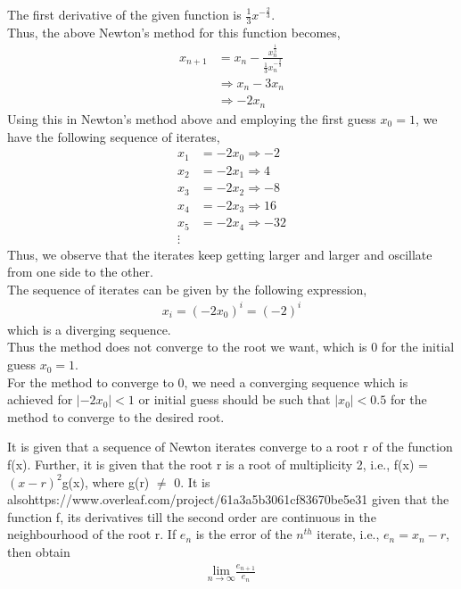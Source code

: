 \documentclass[letterpaper]{exam}
\begin{document}
\begin{questions}
\begin{solution}
The first derivative of the given function is $\frac{1}{3}x^{-\frac{2}{3}}$.\\
Thus, the above Newton's method for this function becomes,
\begin{align*}
    x_{n+1} &= x_n - \frac{x_n^{\frac{1}{3}}}{\frac{1}{3}x_n^{-\frac{2}{3}}}\\
    &\Rightarrow 
    x_n - 3x_n\\
    &\Rightarrow
    -2x_n
\end{align*}
Using this in Newton's method above and employing the first guess $x_0 = 1$, we have the following sequence of iterates,
\begin{align*}
    x_1 &= -2x_0 \Rightarrow -2\\
    x_2 &= -2x_1 \Rightarrow 4\\
    x_3 &= -2x_2 \Rightarrow -8\\
    x_4 &= -2x_3 \Rightarrow 16\\
    x_5 &= -2x_4 \Rightarrow -32\\
    \vdots
\end{align*}
Thus, we observe that the iterates keep getting larger and larger and oscillate from one side to the other.\\
The sequence of iterates can be given by the following expression,
\begin{align*}
    x_i = (-2x_0)^i = (-2)^i
\end{align*}
which is a diverging sequence.\\
Thus the method does not converge to the root we want, which is 0 for the initial guess $x_0 = 1$.\\
For the method to converge to 0, we need a converging sequence which is achieved for $\left|-2x_0\right| < 1$ or initial guess should be such that $\left|x_0\right| < 0.5$ for the method to converge to the desired root.
\end{solution}
\question [6]  It is given that a sequence of Newton iterates converge to a root r of the function f(x). Further, it is given that the root r is a root of multiplicity 2, i.e., f(x) = $(x − r)^2$g(x), where g(r) $\neq$ 0. It is alsohttps://www.overleaf.com/project/61a3a5b3061cf83670be5e31
given that the function f, its derivatives till the second order are continuous in the neighbourhood of the root r. If $e_n$ is the error of the $n^{th}$ iterate, i.e., $e_n = x_n − r$, then obtain
\begin{align*}
    \underset{n \rightarrow \infty }{\text{lim} } \frac{e_{n+1}}{e_{n}}
\end{align*}

\end{questions}
\end{document}
